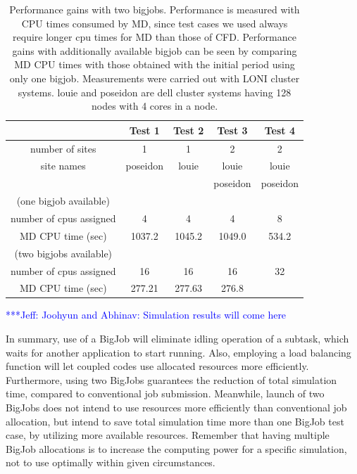 \documentclass[conference,final]{IEEEtran}
\newcommand{\skonote}[1]{ {\textcolor{blue} { ***Jeff: #1 }}}
\newcommand{\skonote}[1]{}
\begin{document}
\begin{table}[!h]
\begin{center}
  \caption{Performance gains with two bigjobs. Performance is measured with CPU times consumed by MD, since test cases we used always require longer cpu times for MD than those of CFD.  Performance gains with additionally available bigjob can be seen by comparing MD CPU times with those obtained with the initial period using only one bigjob.  Measurements were carried out with LONI cluster systems.  louie and poseidon are dell cluster systems having 128 nodes with 4 cores in a node. \newline }
\label{table:TwoBigJobs}
\begin{tabular}{ c| c c c c }
\hline
 & Test 1   & Test 2 & Test 3   & Test 4 \\
\hline
number of sites & 1 & 1 & 2 & 2  \\
site names & poseidon & louie & louie& louie \\
& & & poseidon  & poseidon \\
\hline
(one bigjob available) & & & & \\
number of cpus assigned & 4 & 4 & 4 & 8 \\
MD CPU time  (sec) & 1037.2 & 1045.2 & 1049.0 & 534.2  \\
\hline
(two bigjobs available) & & & & \\
number of cpus assigned & 16 & 16 & 16 & 32 \\

MD CPU time  (sec) & 277.21 & 277.63  & 276.8 &  \\

\hline
\end{tabular}
\end{center}
\end{table}



\skonote{Joohyun and Abhinav: Simulation results will come here}

In summary, use of a BigJob will eliminate idling operation of a subtask, which waits for another application to start running. Also, employing a load balancing function will let coupled codes use allocated resources more efficiently. Furthermore, using two BigJobs guarantees the reduction of total simulation time, compared to conventional job submission. Meanwhile, launch of two BigJobs does not intend to use resources more efficiently than conventional job allocation, but intend to save total simulation time more than one BigJob test case, by utilizing more available resources. Remember that having multiple BigJob allocations is to increase the computing power for a specific simulation, not to use optimally within given circumstances.
\end{document}
